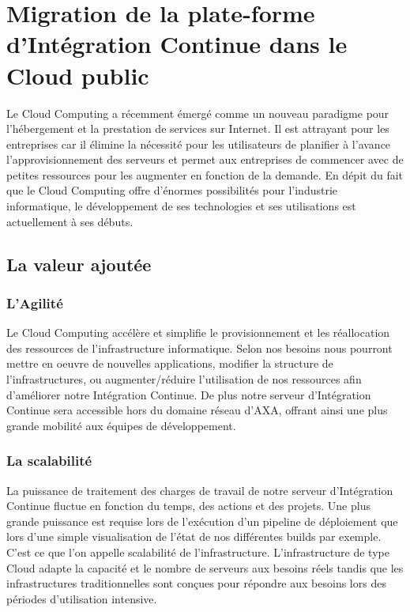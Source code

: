     \section{Migration de la plate-forme d'Intégration Continue dans le Cloud public}
    Le Cloud Computing a récemment émergé comme un nouveau paradigme pour l'hébergement et la prestation de services sur Internet. Il est attrayant pour les entreprises car il élimine la nécessité pour les utilisateurs de planifier à l'avance l'approvisionnement des serveurs et permet aux entreprises de commencer avec de petites ressources pour les augmenter en fonction de la demande. En dépit du fait que le Cloud Computing offre d'énormes possibilités pour l'industrie informatique, le développement de ses technologies et ses utilisations est actuellement à ses débuts.

      \subsection{La valeur ajoutée}
        \subsubsection{L'Agilité}
        Le Cloud Computing accélère et simplifie le provisionnement et les réallocation des ressources de l'infrastructure informatique. Selon nos besoins nous pourront mettre en oeuvre de nouvelles applications, modifier la structure de l'infrastructures, ou augmenter/réduire l'utilisation de nos ressources afin d'améliorer notre Intégration Continue. De plus notre serveur d'Intégration Continue sera accessible hors du domaine réseau d'AXA, offrant ainsi une plus grande mobilité aux équipes de développement.

        \subsubsection{La scalabilité}
        La puissance de traitement des charges de travail de notre serveur d'Intégration Continue fluctue en fonction du temps, des actions et des projets. Une plus grande puissance est requise lors de l'exécution d'un pipeline de déploiement que lors d'une simple visualisation de l'état de nos différentes builds par exemple. C'est ce que l'on appelle scalabilité de l'infrastructure. L'infrastructure de type Cloud adapte la capacité et le nombre de serveurs aux besoins réels tandis que les infrastructures traditionnelles sont conçues pour répondre aux besoins lors des périodes d'utilisation intensive.

